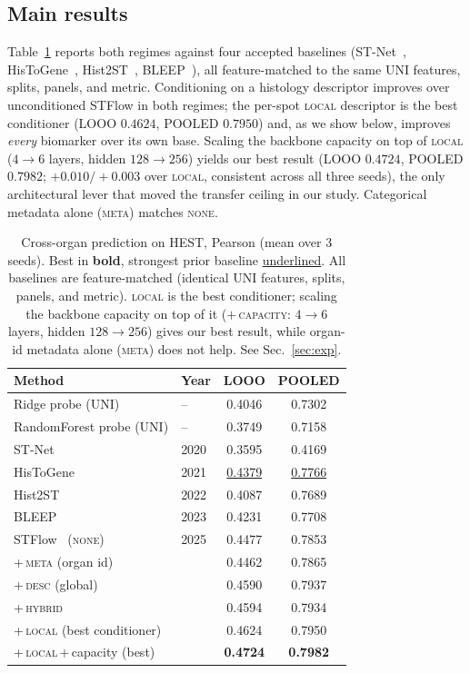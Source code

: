 \documentclass[10pt,twocolumn,letterpaper]{article}
\begin{document}
\subsection{Main results}
Table~\ref{tab:main} reports both regimes against four accepted baselines
(ST-Net~\cite{stnet}, HisToGene~\cite{histogene}, Hist2ST~\cite{hist2st}, BLEEP~\cite{bleep}),
all feature-matched to the same UNI features, splits, panels, and metric.
Conditioning on a histology descriptor improves over unconditioned STFlow in both regimes; the
per-spot \textsc{local} descriptor is the best conditioner (LOOO $0.4624$, POOLED $0.7950$) and,
as we show below, improves \emph{every} biomarker over its own base. Scaling the backbone capacity
on top of \textsc{local} ($4\!\to\!6$ layers, hidden $128\!\to\!256$) yields our best result
(LOOO $0.4724$, POOLED $0.7982$; $+0.010/+0.003$ over \textsc{local}, consistent across all three
seeds), the only architectural lever that moved the transfer ceiling in our study. Categorical
metadata alone (\textsc{meta}) matches \textsc{none}.

\begin{table}[t]
\centering
\small
\setlength{\tabcolsep}{4pt}
\begin{tabular}{llcc}
\toprule
Method & Year & LOOO & POOLED \\
\midrule
Ridge probe (UNI)        & -- & 0.4046 & 0.7302 \\
RandomForest probe (UNI) & -- & 0.3749 & 0.7158 \\
ST-Net~\cite{stnet}        & 2020 & 0.3595 & 0.4169 \\
HisToGene~\cite{histogene} & 2021 & \underline{0.4379} & \underline{0.7766} \\
Hist2ST~\cite{hist2st}     & 2022 & 0.4087 & 0.7689 \\
BLEEP~\cite{bleep}         & 2023 & 0.4231 & 0.7708 \\
\midrule
STFlow~\cite{stflow} (\textsc{none}) & 2025 & 0.4477 & 0.7853 \\
\;+\,\textsc{meta} (organ id) &      & 0.4462 & 0.7865 \\
\;+\,\textsc{desc} (global)   &      & 0.4590 & 0.7937 \\
\;+\,\textsc{hybrid}          &      & 0.4594 & 0.7934 \\
\;+\,\textsc{local} (best conditioner) &  & 0.4624 & 0.7950 \\
\;+\,\textsc{local}\,$+$\,capacity (best) & & \textbf{0.4724} & \textbf{0.7982} \\
\bottomrule
\end{tabular}
\caption{Cross-organ prediction on HEST, Pearson (mean over 3 seeds). Best in \textbf{bold},
strongest prior baseline \underline{underlined}. All baselines are feature-matched (identical UNI
features, splits, panels, and metric). \textsc{local} is the best conditioner; scaling the backbone
capacity on top of it (\textsc{$+$\,capacity}: $4\!\to\!6$ layers, hidden $128\!\to\!256$) gives our
best result, while organ-id metadata alone (\textsc{meta}) does not help. See
Sec.~\ref{sec:exp}.}
\label{tab:main}
\end{table}
\end{document}

